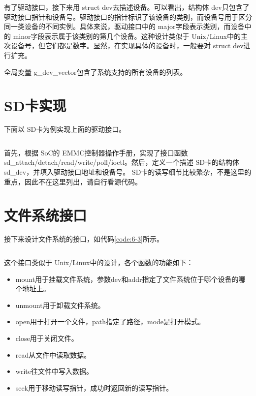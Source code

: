 \documentclass[main.tex]{subfiles}
\begin{document}
\begin{CJK*}{UTF8}{song}
有了驱动接口，接下来用 struct dev去描述设备。可以看出，结构体 dev只包含了驱动接口指针和设备号。驱动接口的指针标识了该设备的类别，而设备号用于区分同一类设备的不同实例。具体来说，驱动接口中的 major字段表示类别，而设备中的 minor字段表示属于该类别的第几个设备。这种设计类似于 Unix/Linux中的主次设备号，但它们都是数字。显然，在实现具体的设备时，一般要对 struct dev进行扩充。

\par
全局变量 g\_dev\_vector包含了系统支持的所有设备的列表。

\section{SD卡实现}
下面以 SD卡为例实现上面的驱动接口。

\begin{code}
\label{code:6-2}
\inputminted[firstline=1737,lastline=1754,linenos,numbersep=5pt,frame=lines,framesep=2mm]{c}{src/chapter06/kernel/sdcard.c}
\end{code}

首先，根据 SoC的 EMMC控制器操作手册，实现了接口函数 sd\_\-attach/\-detach/\-read/\-write/\-poll/\-ioctl。然后，定义一个描述 SD卡的结构体 sd\_dev，并填入驱动接口地址和设备号。 SD卡的读写细节比较繁杂，不是这里的重点，因此不在这里列出，请自行看源代码。

\section{文件系统接口}
接下来设计文件系统的接口，如代码\ref{code:6-3}所示。

\begin{code}
\label{code:6-3}
\inputminted[firstline=159,lastline=189,linenos,numbersep=5pt,frame=lines,framesep=2mm]{c}{src/chapter06/kernel/kernel.h}
\end{code}

\noindent
这个接口类似于 Unix/Linux中的设计，各个函数的功能如下：

\begin{itemize}
\item mount用于挂载文件系统，参数dev和addr指定了文件系统位于哪个设备的哪个地址上。
\item unmount用于卸载文件系统。
\item open用于打开一个文件，path指定了路径，mode是打开模式。
\item close用于关闭文件。
\item read从文件中读取数据。
\item write往文件中写入数据。
\item seek用于移动读写指针，成功时返回新的读写指针。
\end{itemize}


\end{CJK*}
\end{document}
